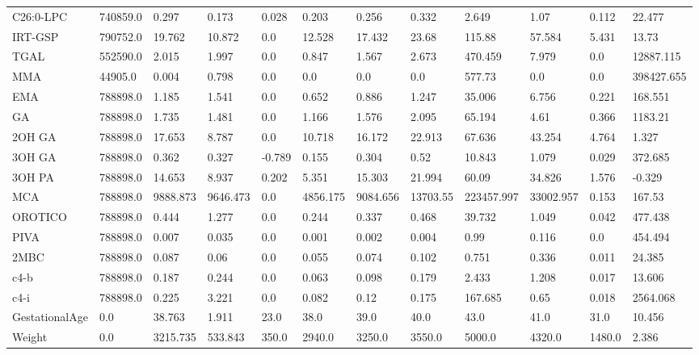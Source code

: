 \begin{tabular}{llllllllllll}
C26:0-LPC & 740859.0 & 0.297 & 0.173 & 0.028 & 0.203 & 0.256 & 0.332 & 2.649 & 1.07 & 0.112 & 22.477 \\
IRT-GSP & 790752.0 & 19.762 & 10.872 & 0.0 & 12.528 & 17.432 & 23.68 & 115.88 & 57.584 & 5.431 & 13.73 \\
TGAL & 552590.0 & 2.015 & 1.997 & 0.0 & 0.847 & 1.567 & 2.673 & 470.459 & 7.979 & 0.0 & 12887.115 \\
MMA & 44905.0 & 0.004 & 0.798 & 0.0 & 0.0 & 0.0 & 0.0 & 577.73 & 0.0 & 0.0 & 398427.655 \\
EMA & 788898.0 & 1.185 & 1.541 & 0.0 & 0.652 & 0.886 & 1.247 & 35.006 & 6.756 & 0.221 & 168.551 \\
GA & 788898.0 & 1.735 & 1.481 & 0.0 & 1.166 & 1.576 & 2.095 & 65.194 & 4.61 & 0.366 & 1183.21 \\
2OH GA & 788898.0 & 17.653 & 8.787 & 0.0 & 10.718 & 16.172 & 22.913 & 67.636 & 43.254 & 4.764 & 1.327 \\
3OH GA & 788898.0 & 0.362 & 0.327 & -0.789 & 0.155 & 0.304 & 0.52 & 10.843 & 1.079 & 0.029 & 372.685 \\
3OH PA & 788898.0 & 14.653 & 8.937 & 0.202 & 5.351 & 15.303 & 21.994 & 60.09 & 34.826 & 1.576 & -0.329 \\
MCA & 788898.0 & 9888.873 & 9646.473 & 0.0 & 4856.175 & 9084.656 & 13703.55 & 223457.997 & 33002.957 & 0.153 & 167.53 \\
OROTICO & 788898.0 & 0.444 & 1.277 & 0.0 & 0.244 & 0.337 & 0.468 & 39.732 & 1.049 & 0.042 & 477.438 \\
PIVA & 788898.0 & 0.007 & 0.035 & 0.0 & 0.001 & 0.002 & 0.004 & 0.99 & 0.116 & 0.0 & 454.494 \\
2MBC & 788898.0 & 0.087 & 0.06 & 0.0 & 0.055 & 0.074 & 0.102 & 0.751 & 0.336 & 0.011 & 24.385 \\
c4-b & 788898.0 & 0.187 & 0.244 & 0.0 & 0.063 & 0.098 & 0.179 & 2.433 & 1.208 & 0.017 & 13.606 \\
c4-i & 788898.0 & 0.225 & 3.221 & 0.0 & 0.082 & 0.12 & 0.175 & 167.685 & 0.65 & 0.018 & 2564.068 \\
GestationalAge & 0.0 & 38.763 & 1.911 & 23.0 & 38.0 & 39.0 & 40.0 & 43.0 & 41.0 & 31.0 & 10.456 \\
Weight & 0.0 & 3215.735 & 533.843 & 350.0 & 2940.0 & 3250.0 & 3550.0 & 5000.0 & 4320.0 & 1480.0 & 2.386 \\
\bottomrule
\end{tabular}
